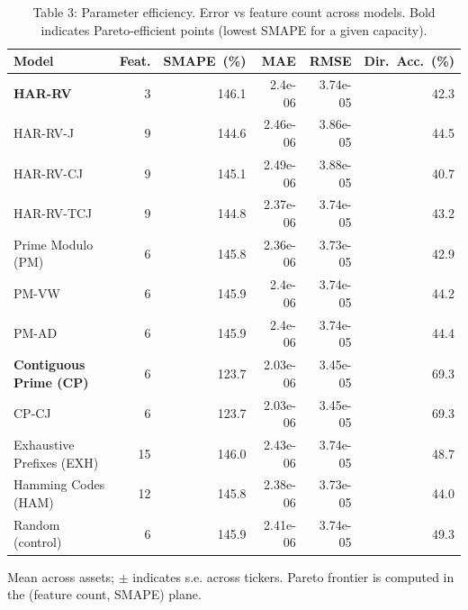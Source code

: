 \begin{table}[t]
\centering
\caption{Table 3: Parameter efficiency. Error vs feature count across models. Bold indicates Pareto-efficient points (lowest SMAPE for a given capacity).}
\label{tab:param_efficiency}
\begin{tabular}{l r r r r r}
\toprule
Model & Feat. & SMAPE~(\%) & MAE & RMSE & Dir.~Acc.~(\%) \\
\midrule
\textbf{HAR-RV} & 3 & 146.1 & 2.4e-06 & 3.74e-05 & 42.3 \\
HAR-RV-J & 9 & 144.6 & 2.46e-06 & 3.86e-05 & 44.5 \\
HAR-RV-CJ & 9 & 145.1 & 2.49e-06 & 3.88e-05 & 40.7 \\
HAR-RV-TCJ & 9 & 144.8 & 2.37e-06 & 3.74e-05 & 43.2 \\
Prime Modulo (PM) & 6 & 145.8 & 2.36e-06 & 3.73e-05 & 42.9 \\
PM-VW & 6 & 145.9 & 2.4e-06 & 3.74e-05 & 44.2 \\
PM-AD & 6 & 145.9 & 2.4e-06 & 3.74e-05 & 44.4 \\
\textbf{Contiguous Prime (CP)} & 6 & 123.7 & 2.03e-06 & 3.45e-05 & 69.3 \\
CP-CJ & 6 & 123.7 & 2.03e-06 & 3.45e-05 & 69.3 \\
Exhaustive Prefixes (EXH) & 15 & 146.0 & 2.43e-06 & 3.74e-05 & 48.7 \\
Hamming Codes (HAM) & 12 & 145.8 & 2.38e-06 & 3.73e-05 & 44.0 \\
Random (control) & 6 & 145.9 & 2.41e-06 & 3.74e-05 & 49.3 \\
\bottomrule
\end{tabular}
\vspace{2pt}
\footnotesize{Mean across assets; $\pm$ indicates s.e. across tickers. Pareto frontier is computed in the (feature count, SMAPE) plane.}
\end{table}